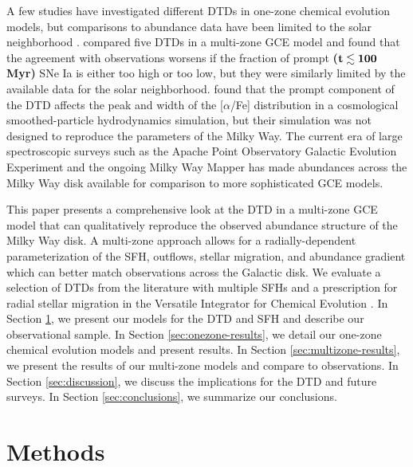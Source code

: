\documentclass[twocolumn,twocolappendix,linenumbers]{aastex631}
\newcommand{\aFe}{[$\alpha$/Fe]\xspace}
\newcommand{\vice}{{\tt VICE}\xspace}
\begin{document}
A few studies have investigated different DTDs in one-zone chemical evolution models, but comparisons to abundance data have been limited to the solar neighborhood \citep[e.g.,][]{Andrews2017-ChemicalEvolution,Palicio2023-AnalyticDTD}. \citet{Matteucci2009-DTDModels} compared five DTDs in a multi-zone GCE model and found that the agreement with observations worsens if the fraction of prompt {\bf ($\bf t\lesssim 100$ Myr)} SNe Ia is either too high or too low, but they were similarly limited by the available data for the solar neighborhood. \citet{Poulhazan2018-PrecisionPollution} found that the prompt component of the DTD affects the peak and width of the \aFe distribution in a cosmological smoothed-particle hydrodynamics simulation, but their simulation was not designed to reproduce the parameters of the Milky Way. The current era of large spectroscopic surveys such as the Apache Point Observatory Galactic Evolution Experiment \citep[APOGEE;][]{Majewski2017-APOGEE} and the ongoing Milky Way Mapper \citep{Kollmeier2017-SDSS-V} has made abundances across the Milky Way disk available for comparison to more sophisticated GCE models.

This paper presents a comprehensive look at the DTD in a multi-zone GCE model that can qualitatively reproduce the observed abundance structure of the Milky Way disk. A multi-zone approach allows for a radially-dependent parameterization of the SFH, outflows, stellar migration, and abundance gradient which can better match observations across the Galactic disk. We evaluate a selection of DTDs from the literature with multiple SFHs and a prescription for radial stellar migration in the Versatile Integrator for Chemical Evolution \citep[\vice;][]{JohnsonWeinberg2020-Starbursts}. In Section \ref{sec:methods}, we present our models for the DTD and SFH and describe our observational sample. In Section \ref{sec:onezone-results}, we detail our one-zone chemical evolution models and present results. In Section \ref{sec:multizone-results}, we present the results of our multi-zone models and compare to observations. In Section \ref{sec:discussion}, we discuss the implications for the DTD and future surveys. In Section \ref{sec:conclusions}, we summarize our conclusions.

\section{Methods}
\label{sec:methods}
\end{document}
